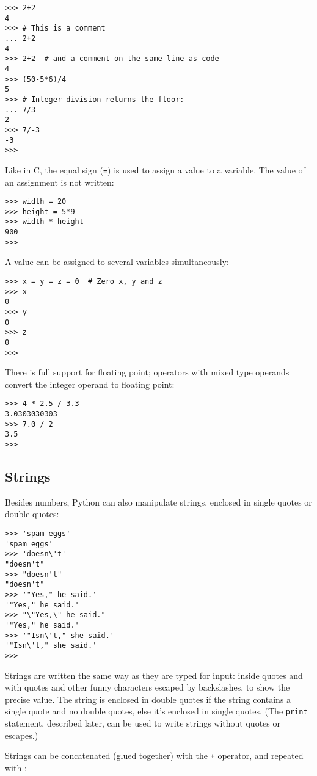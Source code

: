 \bcode\begin{verbatim}
>>> 2+2
4
>>> # This is a comment
... 2+2
4
>>> 2+2  # and a comment on the same line as code
4
>>> (50-5*6)/4
5
>>> # Integer division returns the floor:
... 7/3
2
>>> 7/-3
-3
>>> 
\end{verbatim}\ecode
%
Like in C, the equal sign ({\tt =}) is used to assign a value to a
variable.  The value of an assignment is not written:

\bcode\begin{verbatim}
>>> width = 20
>>> height = 5*9
>>> width * height
900
>>> 
\end{verbatim}\ecode
%
A value can be assigned to several variables simultaneously:

\bcode\begin{verbatim}
>>> x = y = z = 0  # Zero x, y and z
>>> x
0
>>> y
0
>>> z
0
>>> 
\end{verbatim}\ecode
%
There is full support for floating point; operators with mixed type
operands convert the integer operand to floating point:

\bcode\begin{verbatim}
>>> 4 * 2.5 / 3.3
3.0303030303
>>> 7.0 / 2
3.5
>>> 
\end{verbatim}\ecode

\subsection{Strings}

Besides numbers, Python can also manipulate strings, enclosed in
single quotes or double quotes:

\bcode\begin{verbatim}
>>> 'spam eggs'
'spam eggs'
>>> 'doesn\'t'
"doesn't"
>>> "doesn't"
"doesn't"
>>> '"Yes," he said.'
'"Yes," he said.'
>>> "\"Yes,\" he said."
'"Yes," he said.'
>>> '"Isn\'t," she said.'
'"Isn\'t," she said.'
>>> 
\end{verbatim}\ecode
%
Strings are written the same way as they are typed for input: inside
quotes and with quotes and other funny characters escaped by backslashes,
to show the precise value.  The string is enclosed in double quotes if
the string contains a single quote and no double quotes, else it's
enclosed in single quotes.  (The {\tt print} statement, described later,
can be used to write strings without quotes or escapes.)

Strings can be concatenated (glued together) with the {\tt +}
operator, and repeated with {\tt *}:

